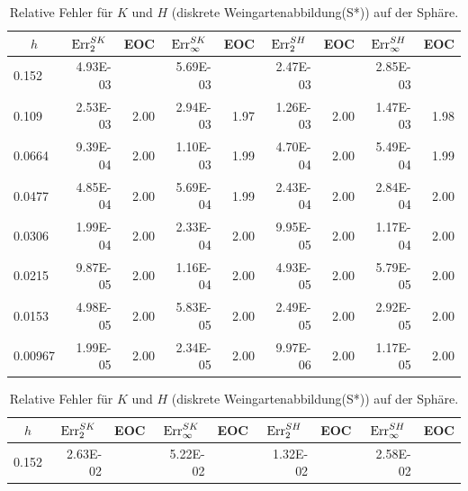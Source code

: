    \begin{table}[htbp]
    \centering
      \begin{tabular}{|l|r|r|r|r|r|r|r|r|}
      \hline
      \multicolumn{1}{|c|}{\rule{0pt}{11pt}\( h \)} & \multicolumn{1}{c|}{\( \text{Err}_{2}^{SK} \)} & \multicolumn{1}{c|}{EOC} & 
           \multicolumn{1}{c|}{\( \text{Err}_{\infty}^{SK} \)} & \multicolumn{1}{c|}{EOC} & \multicolumn{1}{c|}{\( \text{Err}_{2}^{SH} \)} &
           \multicolumn{1}{c|}{EOC} & \multicolumn{1}{c|}{\( \text{Err}_{\infty}^{SH} \)} & \multicolumn{1}{c|}{EOC} \\ \hline
      0.152 & 4.93E-03 & \multicolumn{1}{l|}{} & 5.69E-03 & \multicolumn{1}{l|}{} & 2.47E-03 & \multicolumn{1}{l|}{} & 2.85E-03 & \multicolumn{1}{l|}{} \\ \hline
      0.109 & 2.53E-03 & 2.00 & 2.94E-03 & 1.97 & 1.26E-03 & 2.00 & 1.47E-03 & 1.98 \\ \hline
      0.0664 & 9.39E-04 & 2.00 & 1.10E-03 & 1.99 & 4.70E-04 & 2.00 & 5.49E-04 & 1.99 \\ \hline
      0.0477 & 4.85E-04 & 2.00 & 5.69E-04 & 1.99 & 2.43E-04 & 2.00 & 2.84E-04 & 2.00 \\ \hline
      0.0306 & 1.99E-04 & 2.00 & 2.33E-04 & 2.00 & 9.95E-05 & 2.00 & 1.17E-04 & 2.00 \\ \hline
      0.0215 & 9.87E-05 & 2.00 & 1.16E-04 & 2.00 & 4.93E-05 & 2.00 & 5.79E-05 & 2.00 \\ \hline
      0.0153 & 4.98E-05 & 2.00 & 5.83E-05 & 2.00 & 2.49E-05 & 2.00 & 2.92E-05 & 2.00 \\ \hline
      0.00967 & 1.99E-05 & 2.00 & 2.34E-05 & 2.00 & 9.97E-06 & 2.00 & 1.17E-05 & 2.00 \\ \hline
      \end{tabular}
      \caption[Weingarten auf der Sphäre (S*)]{Relative Fehler für \( K \) und \( H \) (diskrete Weingartenabbildung(S*)) auf der Sphäre.}
      \label{tabSphereWeingarten}
      \vspace{10pt}
    \centering
      \begin{tabular}{|l|r|r|r|r|r|r|r|r|}
      \hline
      \multicolumn{1}{|c|}{\rule{0pt}{11pt}\( h \)} & \multicolumn{1}{c|}{\( \text{Err}_{2}^{SK} \)} & \multicolumn{1}{c|}{EOC} & 
           \multicolumn{1}{c|}{\( \text{Err}_{\infty}^{SK} \)} & \multicolumn{1}{c|}{EOC} & \multicolumn{1}{c|}{\( \text{Err}_{2}^{SH} \)} &
           \multicolumn{1}{c|}{EOC} & \multicolumn{1}{c|}{\( \text{Err}_{\infty}^{SH} \)} & \multicolumn{1}{c|}{EOC} \\ \hline
           0.152 & 2.63E-02 & \multicolumn{1}{l|}{} & 5.22E-02 & \multicolumn{1}{l|}{} & 1.32E-02 & \multicolumn{1}{l|}{} & 2.58E-02 & \multicolumn{1}{l|}{} \\ \hline

\end{tabular}
\end{table}
